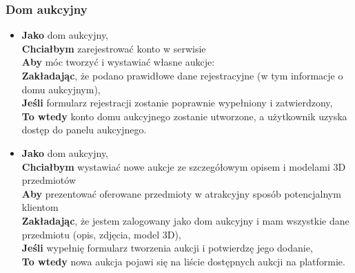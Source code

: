 \subsubsection{Dom aukcyjny}
\begin{itemize}
    \item \textbf{Jako} dom aukcyjny,\\
          \textbf{Chciałbym} zarejestrować konto w serwisie \\
          \textbf{Aby} móc tworzyć i wystawiać własne aukcje:\\
          \textbf{Zakładając}, że podano prawidłowe dane rejestracyjne (w tym informacje o domu aukcyjnym),\\
          \textbf{Jeśli} formularz rejestracji zostanie poprawnie wypełniony i zatwierdzony,\\
          \textbf{To wtedy} konto domu aukcyjnego zostanie utworzone, a użytkownik uzyska dostęp do panelu aukcyjnego.\\



    \item \textbf{Jako} dom aukcyjny,\\
          \textbf{Chciałbym} wystawiać nowe aukcje ze szczegółowym opisem i modelami 3D przedmiotów \\
          \textbf{Aby} prezentować oferowane przedmioty w atrakcyjny sposób potencjalnym klientom\\
          \textbf{Zakładając}, że jestem zalogowany jako dom aukcyjny i mam wszystkie dane przedmiotu (opis, zdjęcia, model 3D),\\
          \textbf{Jeśli} wypełnię formularz tworzenia aukcji i potwierdzę jego dodanie, \\
          \textbf{To wtedy} nowa aukcja pojawi się na liście dostępnych aukcji na platformie.
\end{itemize}



